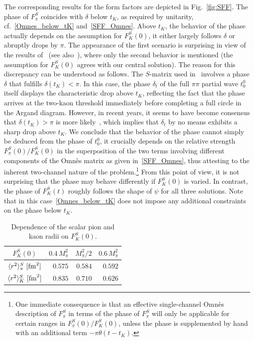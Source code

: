 \documentclass[11pt]{article}%
\newcommand{\mpi}{M_{\pi}}
\newcommand{\tK}{t_K}
\begin{document}
The corresponding results for the form factors are depicted in Fig.~\ref{fig:SFF}. The phase of $F^S_\pi$ coincides with $\delta$ below $\tK$, as required by unitarity, cf.~\eqref{Omnes_below_tK} and~\eqref{SFF_Omnes}. Above $\tK$, the behavior of the phase actually depends on the assumption for $F^S_K(0)$, it either largely follows $\delta$ or abruptly drops by $\pi$. The appearance of the first scenario is surprising in view of the results of~\cite{ACCGL} (see also~\cite{Oller2007}), where only the second behavior is mentioned (the assumption for $F^S_K(0)$ agrees with our central solution). The reason for this discrepancy can be understood as follows. The $S$-matrix used in~\cite{ACCGL} involves a phase $\delta$ that fulfills $\delta(\tK)<\pi$. In this case, the phase $\delta_t$ of the full $\pi\pi$ partial wave $t^0_0$ itself displays the characteristic drop above $\tK$, reflecting the fact that the phase arrives at the two-kaon threshold immediately before completing a full circle in the Argand diagram. However, in recent years, it seems to have become consensus that $\delta(\tK)>\pi$ is more likely~\cite{CCL:Regge,CCL:PWA,GKPY,Moussallam11}, which implies that $\delta_t$ by no means exhibits a sharp drop above $\tK$. We conclude that the behavior of the phase cannot simply be deduced from the phase of $t^0_0$, it crucially depends on the relative strength $F^S_\pi(0)/F^S_K(0)$ in the superposition of the two terms involving different components of the Omn\`es matrix as given in~\eqref{SFF_Omnes}, thus attesting to the inherent two-channel nature of the problem.\footnote{One immediate consequence is that an effective single-channel Omn\`es description of $F^S_\pi$ in terms of the phase of $F^S_\pi$ will only be applicable for certain ranges in $F^S_\pi(0)/F^S_K(0)$, unless the phase is supplemented by hand with an additional term $-\pi\theta(t-\tK)$.}  From this point of view, it is not surprising that the phase may behave differently if $F^S_K(0)$ is varied.  In contrast, the phase of $F^S_K(t)$ roughly follows the shape of $\psi$ for all three solutions. Note that in this case~\eqref{Omnes_below_tK} does not impose any additional constraints on the phase below $\tK$.

\begin{table}
\renewcommand{\arraystretch}{1.3}
\centering
\begin{tabular}{c r r r}
\toprule
$F^S_K(0)$ & $0.4\,\mpi^2$ & $\mpi^2/2$ & $0.6\,\mpi^2$ \\
\midrule
$\langle r^2\rangle^S_\pi~[{\rm fm}^2]$ & $0.575$ & $0.584$ & $0.592$\\
$\langle r^2\rangle^S_K~[{\rm fm}^2]$ & $0.835$ & $0.710$ & $0.626$\\
\bottomrule
\end{tabular}
\renewcommand{\arraystretch}{1.0}
\caption{Dependence of the scalar pion and kaon radii on $F^S_K(0)$.}
\label{tab:radii}
\end{table}
\end{document}
